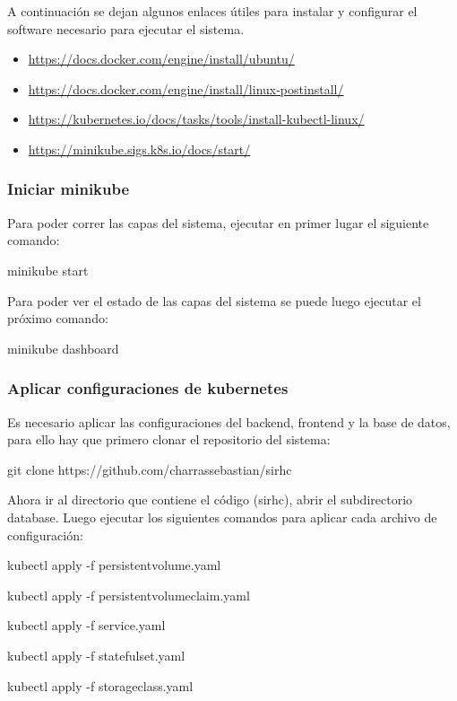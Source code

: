 \documentclass{article}
\begin{document}
A continuación se dejan algunos enlaces útiles para instalar y configurar el software necesario para ejecutar el sistema.

\begin{itemize}
    \item \href{https://docs.docker.com/engine/install/ubuntu/}{https://docs.docker.com/engine/install/ubuntu/}
    \item \href{https://docs.docker.com/engine/install/linux-postinstall/}{https://docs.docker.com/engine/install/linux-postinstall/}
    \item \href{https://kubernetes.io/docs/tasks/tools/install-kubectl-linux/}{https://kubernetes.io/docs/tasks/tools/install-kubectl-linux/}
    \item \href{https://minikube.sigs.k8s.io/docs/start/}{https://minikube.sigs.k8s.io/docs/start/}
\end{itemize}

\subsubsection{Iniciar minikube}
Para poder correr las capas del sistema, ejecutar en primer lugar el siguiente comando:

minikube start

Para poder ver el estado de las capas del sistema se puede luego ejecutar el próximo comando:

minikube dashboard

\subsubsection{Aplicar configuraciones de kubernetes}
Es necesario aplicar las configuraciones del backend, frontend y la base de datos, para ello hay que primero clonar el repositorio del sistema:

git clone https://github.com/charrassebastian/sirhc

Ahora ir al directorio que contiene el código (sirhc), abrir el subdirectorio database. Luego ejecutar los siguientes comandos para aplicar cada archivo de configuración:

kubectl apply -f persistentvolume.yaml

kubectl apply -f persistentvolumeclaim.yaml

kubectl apply -f service.yaml

kubectl apply -f statefulset.yaml

kubectl apply -f storageclass.yaml
\end{document}
